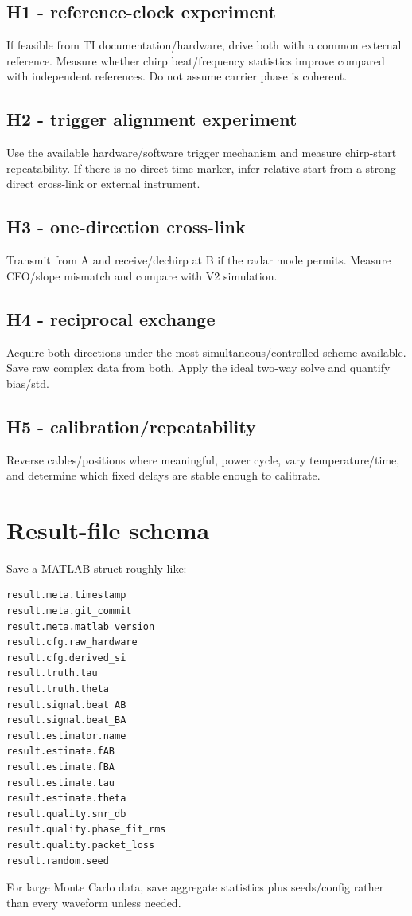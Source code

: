 \documentclass[11pt]{article}
\begin{document}
\subsection*{H1 - reference-clock experiment}
If feasible from TI documentation/hardware, drive both with a common external reference. Measure whether chirp beat/frequency statistics improve compared with independent references. Do not assume carrier phase is coherent.

\subsection*{H2 - trigger alignment experiment}
Use the available hardware/software trigger mechanism and measure chirp-start repeatability. If there is no direct time marker, infer relative start from a strong direct cross-link or external instrument.

\subsection*{H3 - one-direction cross-link}
Transmit from A and receive/dechirp at B if the radar mode permits. Measure CFO/slope mismatch and compare with V2 simulation.

\subsection*{H4 - reciprocal exchange}
Acquire both directions under the most simultaneous/controlled scheme available. Save raw complex data from both. Apply the ideal two-way solve and quantify bias/std.

\subsection*{H5 - calibration/repeatability}
Reverse cables/positions where meaningful, power cycle, vary temperature/time, and determine which fixed delays are stable enough to calibrate.

\section{Result-file schema}
Save a MATLAB struct roughly like:
\begin{verbatim}
result.meta.timestamp
result.meta.git_commit
result.meta.matlab_version
result.cfg.raw_hardware
result.cfg.derived_si
result.truth.tau
result.truth.theta
result.signal.beat_AB
result.signal.beat_BA
result.estimator.name
result.estimate.fAB
result.estimate.fBA
result.estimate.tau
result.estimate.theta
result.quality.snr_db
result.quality.phase_fit_rms
result.quality.packet_loss
result.random.seed
\end{verbatim}
For large Monte Carlo data, save aggregate statistics plus seeds/config rather than every waveform unless needed.
\end{document}
